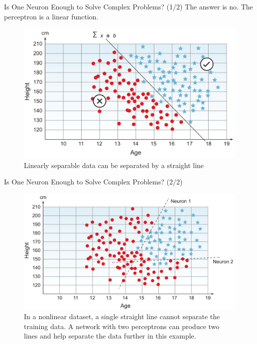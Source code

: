 \documentclass{beamer}
\begin{document}
\begin{frame}{Is One Neuron Enough to Solve Complex Problems? (1/2)}
	The answer is no. The perceptron is a linear function.
	\begin{figure}[ht]
	\centering
	\includegraphics[scale=0.2]{images/linear-separable}
	\caption{Linearly separable data can be separated by a straight line}
\end{figure}					
\end{frame}

\begin{frame}{Is One Neuron Enough to Solve Complex Problems? (2/2)}
	\begin{figure}[ht]
		\centering
		\includegraphics[scale=0.2]{images/nonlinear-separable}
		\caption{In a nonlinear dataset, a single straight line cannot separate the training data. A network with two perceptrons can produce two lines and help separate the data further in this example.}
	\end{figure}					
\end{frame}
\end{document}
